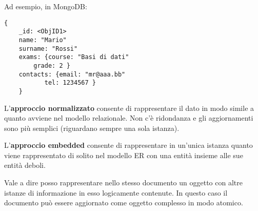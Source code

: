 \documentclass[a4paper, 10pt]{article}
\theoremstyle{definition}
\begin{document}
		Ad esempio, in MongoDB:
	\begin{center}
			\lstset{framexleftmargin=-1.5cm,framexrightmargin=-2cm,frameround=tttt}
			\begin{lstlisting}[frame=tblr,caption={Student Document}]
	{
	_id: <ObjID1>
	name: "Mario"
	surname: "Rossi"
	exams: {course: "Basi di dati"	
		grade: 2 }
	contacts: {email: "mr@aaa.bb"
		   tel: 1234567 }
	}
	\end{lstlisting}
	\end{center}
		
		\noindent
		L’\textbf{approccio normalizzato} consente di rappresentare il dato
		in modo simile a quanto avviene nel modello relazionale.
		Non c’è ridondanza e gli aggiornamenti sono più semplici
		(riguardano sempre una sola istanza).
		
		\noindent
		L’\textbf{approccio embedded} consente di rappresentare in
		un’unica istanza quanto viene rappresentato di solito nel
		modello ER con una entità insieme alle sue entità deboli.
		
		\noindent
		Vale a dire posso rappresentare nello stesso documento un
		oggetto con altre istanze di informazione in esso
		logicamente contenute. In questo caso il documento può
		essere aggiornato come oggetto complesso in modo
		atomico.	
\end{document}

